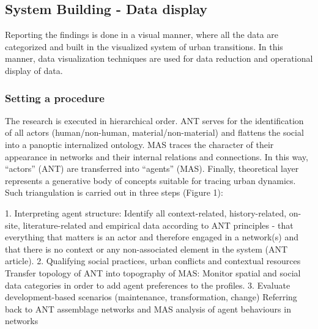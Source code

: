 \documentclass[11pt]{report}
\begin{document}
\subsection{System Building - Data display}

Reporting the findings is done in a visual manner, where all the data are categorized and built in the visualized system of urban transitions. In this manner, data visualization techniques are used for data reduction and operational display of data.

\subsubsection{Setting a procedure}

The research is executed in hierarchical order. ANT serves for the identification of all actors (human/non-human, material/non-material) and flattens the social into a panoptic internalized ontology. MAS traces the character of their appearance in networks and their internal relations and connections. In this way, “actors” (ANT) are transferred into “agents” (MAS). Finally, theoretical layer represents a generative body of concepts suitable for tracing urban dynamics. Such triangulation is carried out in three steps (Figure 1):

1.	Interpreting agent structure:
Identify all context-related, history-related, on-site, literature-related and empirical data according to ANT principles - that everything that matters is an actor and therefore engaged in a network(s) and that there is no context or any non-associated element in the system (ANT article). 
2.	Qualifying social practices, urban conflicts and contextual resources Transfer topology of ANT into topography of MAS:
Monitor spatial and social data categories in order to add agent preferences to the profiles. 
3.	Evaluate development-based scenarios (maintenance, transformation, change)
Referring back to ANT assemblage networks and MAS analysis of agent behaviours in networks
\end{document}
